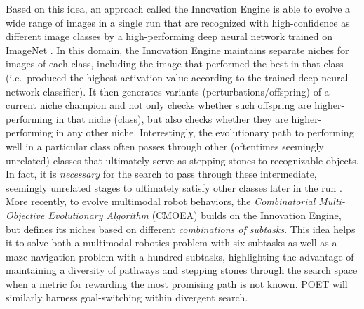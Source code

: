 \documentclass{article}
\begin{document}
Based on this idea, an approach called the Innovation Engine \cite{nguyen2016innovative} is able to evolve a wide range of images in a single run that are recognized with high-confidence as different image classes by a high-performing deep neural network trained on ImageNet \cite{alexnet2012}. In this domain, the Innovation Engine maintains separate niches for images of each class,  including the image that performed the best in that class (i.e.\ produced the highest activation value according to the trained deep neural network classifier). It then generates variants (perturbations/offspring) of a current niche  champion and not only checks whether such offspring are higher-performing in that niche (class), but also checks whether they are higher-performing in any other niche. Interestingly, the evolutionary path to performing well in a particular class often passes through other (oftentimes seemingly unrelated) classes that ultimately serve as stepping stones to recognizable objects. In fact, it is \emph{necessary} for the search to pass through these intermediate, seemingly unrelated stages to ultimately satisfy other classes later in the run \cite{nguyen2016innovative}.  More recently, to evolve multimodal robot behaviors, the \textit{Combinatorial Multi-Objective Evolutionary Algorithm} (CMOEA) \cite{huizinga2016does, Joost:arxiv18} builds on the Innovation Engine, but defines its niches based on different \emph{combinations of subtasks}.  This idea helps it to solve both a multimodal robotics problem with six subtasks as well as a maze navigation problem with a hundred subtasks, highlighting the advantage of maintaining a diversity of pathways and stepping stones through the search space when a metric for rewarding the most promising path is not known.  POET will similarly harness goal-switching within divergent search.
\end{document}
